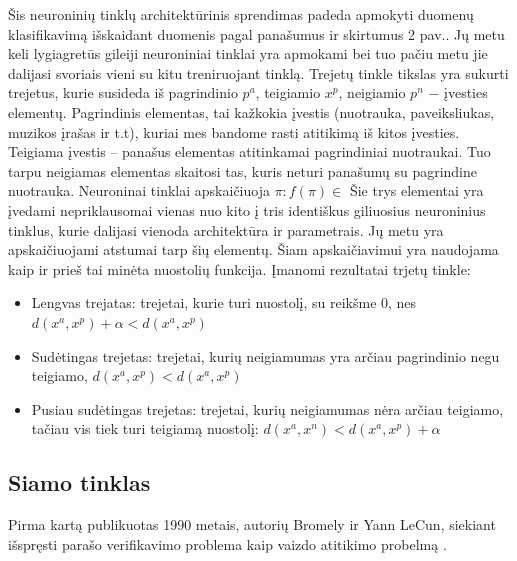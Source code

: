 \documentclass{VUMIFPSkursinis}
\DeclareRobustCommand{\[}{\begin{equation}}
\DeclareRobustCommand{\]}{\end{equation}}
\begin{document}
Šis neuroninių tinklų architektūrinis sprendimas padeda apmokyti duomenų klasifikavimą išskaidant duomenis pagal panašumus ir skirtumus 2 pav.. Jų metu keli lygiagretūs gileiji neuroniniai tinklai yra apmokami bei tuo pačiu metu jie dalijasi svoriais vieni su kitu treniruojant tinklą. Trejetų tinkle tikslas yra sukurti trejetus, kurie susideda iš pagrindinio $p^a$, teigiamio $x^p$, neigiamio $p^n$ − įvesties elementų. Pagrindinis elementas, tai kažkokia įvestis (nuotrauka, paveiksliukas, muzikos įrašas ir t.t), kuriai mes bandome rasti atitikimą iš kitos įvesties. Teigiama įvestis – panašus elementas atitinkamai pagrindiniai nuotraukai. Tuo tarpu neigiamas elementas skaitosi tas, kuris neturi panašumų su pagrindine nuotrauka. Neuroninai tinklai apskaičiuoja  $\pi : f(\pi) \in$
Šie trys elementai yra įvedami nepriklausomai vienas nuo kito į  tris identiškus giliuosius neuroninius tinklus, kurie dalijasi vienoda architektūra ir parametrais. Jų metu yra apskaičiuojami atstumai tarp šių elementų. Šiam apskaičiavimui yra naudojama kaip ir prieš tai minėta nuostolių funkcija.
\newline
Įmanomi rezultatai trjetų tinkle:
\begin{itemize}
\item{Lengvas trejatas: trejetai, kurie turi nuostolį, su reikšme 0, nes $d(x^a, x^p) + \alpha < d(x^a, x^p)$}
\item{Sudėtingas trejetas: trejetai, kurių neigiamumas yra arčiau pagrindinio negu teigiamo, $d(x^a, x^p) < d(x^a, x^p)$}
\item{Pusiau sudėtingas trejetas: trejetai, kurių neigiamumas nėra arčiau teigiamo, tačiau vis tiek turi teigiamą nuostolį: $d(x^a, x^n) < d(x^a, x^p) +\alpha$}
\end{itemize}

\subsection{Siamo tinklas}
Pirma kartą publikuotas 1990 metais, autorių Bromely ir Yann LeCun, siekiant išspręsti parašo verifikavimo problema kaip vaizdo atitikimo probelmą \cite{Siamese_signature_verifiction}.
\end{document}
